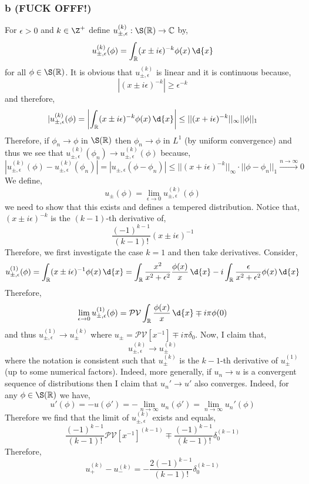 \documentclass[12pt]{article}
\newcommand{\R}{\mathbb{R}}
\renewcommand{\C}{\mathbb{C}}
\begin{document}
\subsubsection{b (FUCK OFFF!)}

For $\epsilon > 0$ and $k \in \Z^{+}$ define $u_{\pm, \epsilon}^{(k)} : \S(\R) \to \C$ by,
\[ u_{\pm, \epsilon}^{(k)}(\phi) = \int_\R (x \pm i \epsilon)^{-k} \phi(x) \, \d{x} \]
for all $\phi \in \S(\R)$. It is obvious that $u_{\pm, \epsilon}^{(k)}$ is linear and it is continuous because,
\[ | (x \pm i \epsilon)^{-k}| \ge \epsilon^{-k} \]
and therefore,
\[ | u_{\pm, \epsilon}^{(k)}(\phi) = \left| \int_\R (x \pm i \epsilon)^{-k} \phi(x) \, \d{x} \right| \le || (x + i \epsilon)^{-k} ||_{\infty} || \phi ||_{1} \]
Therefore, if $\phi_n \to \phi$ in $\S(\R)$ then $\phi_n \to \phi$ in $L^1$ (by uniform convergence) and thus we see that $u_{\pm, \epsilon}^{(k)}(\phi_n) \to u_{\pm, \epsilon}^{(k)}(\phi)$ because,
\[ | u_{\pm, \epsilon}^{(k)}(\phi) - u_{\pm, \epsilon}^{(k)}(\phi_n)| = |u_{\pm,\epsilon}(\phi - \phi_n)| \le || (x + i \epsilon)^{-k} ||_{\infty} \cdot || \phi - \phi_n ||_{1} \xrightarrow{n \to \infty} 0 \]
We define,
\[ u_{\pm}(\phi) = \lim_{\epsilon \to 0} u_{\pm, \epsilon}^{(k)}(\phi) \]
we need to show that this exists and defines a tempered distribution. Notice that, $(x \pm i \epsilon)^{-k}$ is the $(k-1)$-th derivative of,
\[ \frac{(-1)^{k-1}}{(k-1)!} (x \pm i \epsilon)^{-1} \]
Therefore, we first investigate the case $k = 1$ and then take derivatives. Consider,
\[ u_{\pm, \epsilon}^{(1)}(\phi) = \int_\R (x \pm i \epsilon)^{-1} \phi(x) \, \d{x} = \int_{\R} \frac{x^2}{x^2 + \epsilon^2} \frac{\phi(x)}{x} \, \d{x} - i \int_\R \frac{\epsilon}{x^2 + \epsilon^2} \phi(x) \, \d{x} \]
Therefore,
\[ \lim_{\epsilon \to 0} u_{\pm, \epsilon}^{(1)}(\phi) = \mathcal{PV} \int_\R \frac{\phi(x)}{x} \, \d{x} \mp i \pi \phi(0) \]
and thus $u_{\pm, \epsilon}^{(1)} \to u_{\pm}^{(k)}$ where $u_{\pm} = \mathcal{PV}[x^{-1}] \mp i \pi \delta_0$. Now, I claim that,
\[ u_{\pm, \epsilon}^{(k)} \to u_{\pm}^{(k)} \]
where the notation is consistent such that $u_{\pm}^{(k)}$ is the $k-1$-th derivative of $u_{\pm}^{(1)}$ (up to some numerical factors). Indeed, more generally, if $u_n \to u$ is a convergent sequence of distributions then I claim that $u_n' \to u'$ also converges. Indeed, for any $\phi \in \S(\R)$ we have,
\[ u'(\phi) = - u(\phi') = - \lim_{n \to \infty} u_n(\phi') = \lim_{n \to \infty} u_n'(\phi) \]
Therefore we find that the limit of $u_{\pm, \epsilon}^{(k)}$ exists and equals,
\[ \frac{(-1)^{k-1}}{(k - 1)!} \mathcal{PV}[x^{-1}]^{(k-1)} \mp \frac{(-1)^{k-1}}{(k-1)!} \delta_0^{(k-1)} \]
Therefore,
\[ u_{+}^{(k)} - u_{-}^{(k)} = - \frac{2 (-1)^{k-1}}{(k-1)!} \delta_0^{(k-1)} \]
\end{document}
